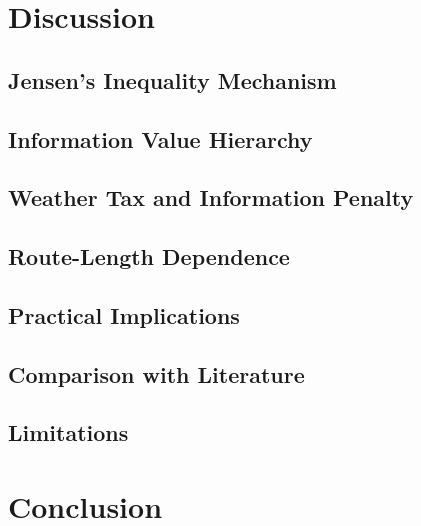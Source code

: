 \documentclass[review]{elsarticle}
\begin{document}
\section{Discussion}
\label{sec:discussion}

\subsection{Jensen's Inequality Mechanism}
\label{sec:jensen}


\subsection{Information Value Hierarchy}


\subsection{Weather Tax and Information Penalty}


\subsection{Route-Length Dependence}


\subsection{Practical Implications}


\subsection{Comparison with Literature}


\subsection{Limitations}



\section{Conclusion}
\label{sec:conclusion}



\fi


\end{document}
